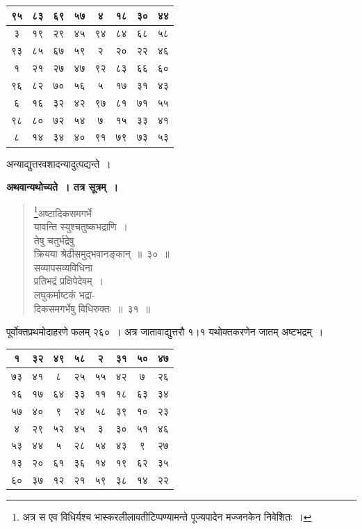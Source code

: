 \documentclass[11pt, openany]{book}
\begin{document}
\begin{table}[h]
	\centering
\begin{tabular}{|c|c|c|c|c|c|c|c|}
	\hline
	९५ & ८३ & ६९ & ५७ & ४ & १८ & ३० & ४४\\
	\hline
	३& १९ & २९ & ४५ & ९४ & ८४ & ६८ & ५८ \\
	\hline
	९३& ८५ & ६७ & ५९ & २ & २० & २२ & ४६\\ 
	\hline
	१ & २१ & २७ & ४७ &९२ & ८३ & ६६ & ६० \\
	\hline
	९६ & ८२ & ७० & ५६ & ५& १७ & ३१ & ४३\\
	\hline
	६ & १६ & ३२ & ४२ & ९७ & ८१ & ७१ & ५५ \\
	\hline
	९८ & ८० & ७२ & ५४ & ७ & १५ & ३३ & ४१\\
	\hline
	८ & १४ & ३४ & ४० & ९१ & ७९ & ७३ & ५३\\
	\hline
\end{tabular}
\end{table}%
\vspace{-2mm}

\begin{center}
अन्याद्युत्तरवशादन्यादुत्पद्यन्ते~।	
\end{center}

\textbf{अथवान्यथोच्यते~। तत्र सूत्रम्~।}

\begin{quote}
\renewcommand{\thefootnote}{१}\footnote{अत्र स एव विधिर्यश्च भास्करलीलावतीटिप्पण्यामन्ते पूज्यपादेन मज्जनकेन निवेशितः~।}{\gk अष्टादिकसमगर्भे\\
यावन्ति स्युश्चतुष्कभद्राणि~।\\
तेषु चतुर्भद्रेषु\\
क्रियया श्रेढीसमुद्भवानङ्कान्~॥~३०~॥\\
सव्यापसव्यविधिना\\
प्रतिभद्रं प्रक्षिपेदेवम्~।\\
लघुकर्माष्टकं भद्रा-\\
दिकसमगर्भेषु विधिरुक्तः~॥~३१~॥}
\end{quote}

\newpage

पूर्वोक्तप्रथमोदाहरणे फलम् २६०~। अत्र जातावाद्युत्तरौ १।१ यथोक्तकरणेन जातम् अष्टभद्रम्~।

\begin{table}[h]
	\centering
	\begin{tabular}{|c|c|c|c|c|c|c|c|}
		\hline
		१ & ३२ & ४९ & ५८ & २ & ३१ & ५० & ४७\\
		\hline
		७३& ४१ & ८ & २५ & ५५ & ४२ & ७ & २६ \\
		\hline
		१६& १७ & ६४ & ३३ & ११ & १८ & ६३ & ३४\\ 
		\hline
		५७ & ४० & ९ & २४ &५८ & ३९ & १० & २३ \\
		\hline
		४& २९ & ५२ & ४५ & ३& ३० & ५१ & ४६\\
		\hline
		५३ & ४४ & ५ & २८ & ५४ & ४३ & ९ & २७ \\
		\hline
		१३ & २० & ६१ & ३६ & १४ & १९ & ६२ & ३५\\
		\hline
		६० & ३७ & १२ & २१ & ५९ & ३८ & १४ & २२\\
		\hline
	\end{tabular}
\end{table}
\vspace{2mm}
\end{document}
